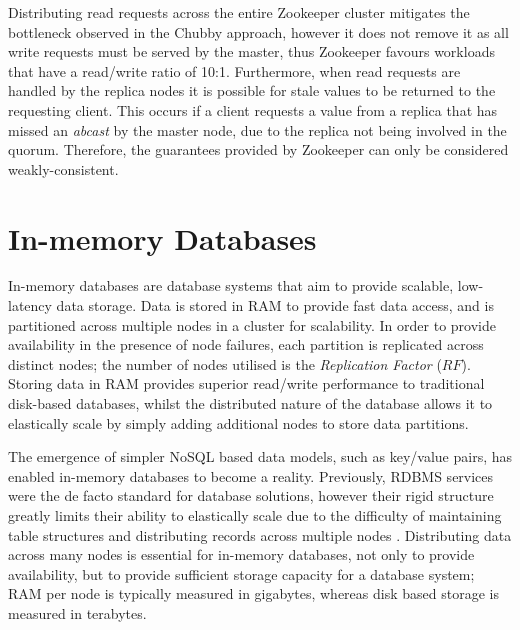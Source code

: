 	Distributing read requests across the entire Zookeeper cluster mitigates the bottleneck observed in the Chubby approach, however it does not remove it as all write requests must be served by the master, thus Zookeeper favours workloads that have a read/write ratio of 10:1. Furthermore, when read requests are handled by the replica nodes it is possible for stale values to be returned to the requesting client.  This occurs if a client requests a value from a replica that has missed an \emph{abcast} by the master node, due to the replica not being involved in the quorum.  Therefore, the guarantees provided by Zookeeper can only be considered weakly-consistent.   


\section{In-memory Databases}
In-memory databases \citep{Infinispan, Hazelcast, GridGain} are database systems that aim to provide scalable, low-latency data storage.  Data is stored in RAM to provide fast data access, and is partitioned across multiple nodes in a cluster for scalability.  In order to provide availability in the presence of node failures, each partition is replicated across distinct nodes; the number of nodes utilised is the \emph{Replication Factor} ($RF$).  Storing data in RAM provides superior read/write performance to traditional disk-based databases, whilst the distributed nature of the database allows it to elastically scale by simply adding additional nodes to store data partitions.  

The emergence of simpler NoSQL based data models, such as key/value pairs, has enabled in-memory databases to become a reality.  Previously, RDBMS services were the de facto standard for database solutions, however their rigid structure greatly limits their ability to elastically scale due to the difficulty of maintaining table structures and distributing records across multiple nodes \citep{Cattell:2011:SSN:1978915.1978919, Cooper:2010:BCS:1807128.1807152}. Distributing data across many nodes is essential for in-memory databases, not only to provide availability, but to provide sufficient storage capacity for a database system; RAM per node is typically measured in gigabytes, whereas disk based storage is measured in terabytes.  

